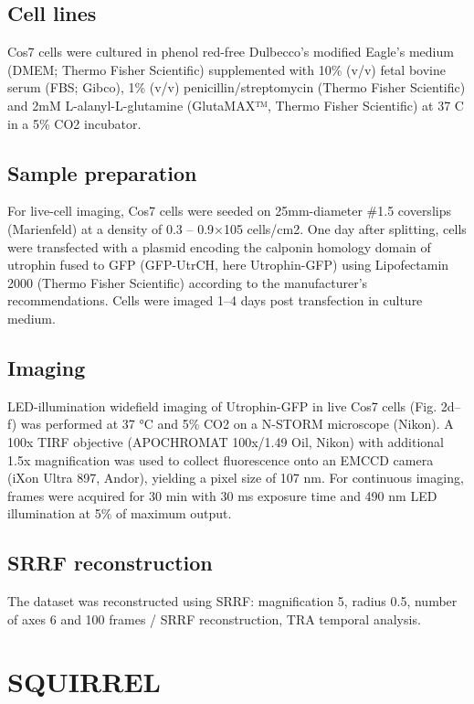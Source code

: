 \subsection{Cell lines}

Cos7 cells were cultured in phenol red-free Dulbecco’s modified Eagle’s medium (DMEM; Thermo Fisher Scientific) supplemented with 10\% (v/v) fetal bovine serum (FBS; Gibco), 1\% (v/v) penicillin/streptomycin (Thermo Fisher Scientific) and 2mM L-alanyl-L-glutamine (GlutaMAX™, Thermo Fisher Scientific) at 37 \degree C in a 5\% CO2 incubator.

\subsection{Sample preparation}

For live-cell imaging, Cos7 cells were seeded on 25mm-diameter \#1.5 coverslips (Marienfeld) at a density of 0.3 – 0.9×105 cells/cm2. One day after splitting, cells were transfected with a plasmid encoding the calponin homology domain of utrophin fused to GFP (GFP-UtrCH, here Utrophin-GFP) \cite{burkel2007versatile} using Lipofectamin 2000 (Thermo Fisher Scientific) according to the manufacturer’s recommendations. Cells were imaged 1–4 days post transfection in culture medium.

\subsection{Imaging}

LED-illumination widefield imaging of Utrophin-GFP in live Cos7 cells (Fig. 2d–f) was performed at 37 °C and 5\% CO2 on a N-STORM microscope (Nikon). A 100x TIRF objective (APOCHROMAT 100x/1.49 Oil, Nikon) with additional 1.5x magnification was used to collect fluorescence onto an EMCCD camera (iXon Ultra 897, Andor), yielding a pixel size of 107 nm. For continuous imaging, frames were acquired for 30 min with 30 ms exposure time and 490 nm LED illumination at 5\% of maximum output. 

\subsection{SRRF reconstruction}

The dataset was reconstructed using SRRF: magnification 5, radius 0.5, number of axes 6 and 100 frames / SRRF reconstruction, TRA temporal analysis. 


\section{SQUIRREL}

